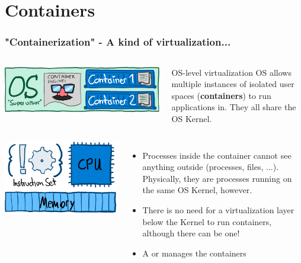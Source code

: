 \section{Containers}
\begin{frame}
	\frametitle{"Containerization" - A kind of virtualization...}
	
	\begin{columns}
			\includegraphics[width=.95\textwidth]{pics/os_cont.png}
			
			\begin{block}{OS-level virtualization\footnotemark[1]}
				OS allows multiple instances of isolated user spaces (\textbf{containers}) to run applications in. They all share the OS Kernel.
			\end{block}
	\end{columns}

	\begin{columns}
		\column{.3\textwidth}
			\includegraphics[width=\textwidth]{pics/computer.png}
		\column{.7\textwidth}
			\begin{itemize}
				\item Processes inside the container cannot see anything outside (processes, files, ...). Physically, they are processes running on the same OS Kernel, however.
				\item There is no need for a virtualization layer below the Kernel to run containers, although there can be one!
				\item A  or  manages the containers
			\end{itemize}
	\end{columns}
	
\end{frame}


